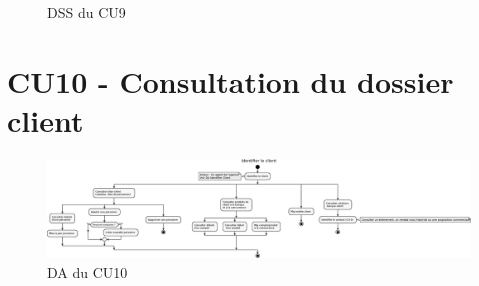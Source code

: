 \begin{figure}[H]
\noindent{}
\caption{DSS du CU9}
\end{figure}


\section{CU10 - Consultation du dossier client}
\begin{figure}[H]
\centering
\includegraphics[width=24cm, angle=90]{figures/eps/DA_CU10.eps}
\caption{DA du CU10}
\end{figure}


